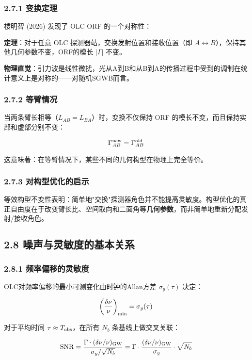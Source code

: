 \documentclass[12pt,a4paper]{article}
\begin{document}
\subsubsection{2.7.1 变换定理}


楼明智 (2026) 发现了 OLC ORF 的一个对称性：

\textbf{定理}：对于任意 OLC 探测器站，交换发射位置和接收位置（即 $A \leftrightarrow B$），保持其他几何参数不变，ORF的模长 $|\Gamma|$ 不变。

\textbf{物理直觉}：引力波是线性微扰，光从A到B和从B到A的传播过程中受到的调制在统计意义上是对称的——对随机SGWB而言。

\subsubsection{2.7.2 等臂情况}


当两条臂长相等（$L_{AB} = L_{BA}$）时，变换不仅保持 ORF 的模长不变，而且保持实部和虚部分别不变：

$$\Gamma_{AB}^{\rm new} = \Gamma_{AB}^{\rm old}$$

这意味著：在等臂情况下，某些不同的几何构型在物理上完全等价。

\subsubsection{2.7.3 对构型优化的启示}


等效构型不变性表明：简单地"交换"探测器角色并不能提高灵敏度。构型优化的真正自由度在于改变臂长比、空间取向和二面角等\textbf{几何参数}，而非简单地重新分配发射/接收角色。

\subsection{2.8 噪声与灵敏度的基本关系}


\subsubsection{2.8.1 频率偏移的灵敏度}


OLC对频率偏移的最小可测变化由时钟的Allan方差 $\sigma_y(\tau)$ 决定：

$$\left(\frac{\delta\nu}{\nu}\right)_{\rm min} = \sigma_y(\tau)$$

对于平均时间 $\tau \approx T_{\rm obs}$，在所有 $N_b$ 条基线上做交叉关联：

$${\rm SNR} = \frac{\Gamma \cdot (\delta\nu/\nu)_{\rm GW}}{\sigma_y / \sqrt{N_b}} = \Gamma \cdot \frac{(\delta\nu/\nu)_{\rm GW}}{\sigma_y} \cdot \sqrt{N_b}$$
\end{document}

